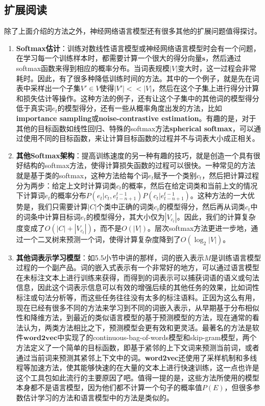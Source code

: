 \documentclass[10pt,a4paper]{ctexart}
\begin{document}
\subsection{扩展阅读}
除了上面介绍的方法之外，神经网络语言模型还有很多其他的扩展问题值得探讨。
\begin{enumerate}
\item[] \textbf{Softmax估计}：训练对数线性语言模型或神经网络语言模型时会有一个问题，在学习每一个训练样本时，都需要计算一个很大的得分向量$\textbf{s}$，然后通过softmax函数来得到相应的概率分布。当词表规模$|V|$变大时，这一过程会非常耗时。因此，有了很多种降低训练时间的方法。其中的一个例子，就是先在词表中采样出一个子集$V' \in V$使得$|V'| << |V|$，然后在这个子集上进行得分计算和损失估计等操作。这种方法的例子，还有让这个子集中的其他词的模型得分低于真实词$e_t$的模型得分，还有一些从概率角度出发的方法，比如\textbf{importance sampling}或\textbf{noise-contrastive estimation}。有趣的是，对于其他的目标函数如线性回归、特殊的softmax方法\textbf{spherical softmax}，可以通过使用不同的目标函数，来让计算目标函数的过程并不与词表大小成正相关。
\item[] \textbf{其他Softmax架构}：提高训练速度的另一种有趣的技巧，就是创造一个具有很好结构的softmax方法，使得计算损失函数的过程可以很快。一种常见的方法就是基于类的softmax，这种方法给每个词$e_t$赋予一个类别$c_t$，然后把计算过程分为两步：给定上文时计算词类$c_t$的概率，然后在给定词类和当前上文的情况下计算词$e_t$的概率分布$P(e_t|c_t,e_{t-n+1}^{t-1})P(c_t|e_{t-n+1}^{t-1})$。这种方法的一大优势是，我们只需要计算$|C|$个类中正确的词类$c_t$的模型得分，然后再从词类$c_t$中的词条中计算目标词$e_t$的模型得分，其大小仅为$|V_{c_t}|$。因此，我们的计算复杂度变成了$O(|C| + |V_{c_t}|)$，而不是$O(|V|)$。层次softmax方法更进一步地，通过一个二叉树来预测一个词，使得计算复杂度降到了$O(\log_2 |V|)$。
\item[] \textbf{其他词表示学习模型}：如5.5小节中讲的那样，词的嵌入表示$M$是训练语言模型过程的一个副产品。词的嵌入式表示有一个非常好的地方，可以通过语言模型在未标注文本上进行训练来获得，而得到的词表示可以捕获词语的语义或句法信息，因此这个词表示信息可以有效的增强后续的其他任务的效果，比如词性标注或句法分析等，而这些任务往往没有太多的标注语料。正因为这么有用，现在已经有很多不同的方法来学习到不同的词嵌入表示，从早期基于分布相似性和降维方法，到最近的类似语言模型的基于预测模型的方法，现在通常的看法认为，两类方法相比之下，预测模型会更有效和更灵活。最著名的方法是软件$\textbf{word2vec}$中实现了的continuous-bag-of-words模型和skip-gram模型，两个方法定义了一个简单的目标函数，即基于紧邻的上下文词来预测当前词，或者通过当前词来预测其紧邻上下文中的词。\textbf{word2vec}还使用了采样机制和多线程等加速方法，使其能够快速的在大量的文本上进行快速训练，这一点也许是这个工具包如此流行的主要原因了吧。值得一提的是，这些方法所使用的模型本身都不是语言模型，因为他们都不计算一个句子的概率值$P(E)$，但很多参数估计学习的方法和语言模型中的方法是类似的。
\end{enumerate}
\end{document}
